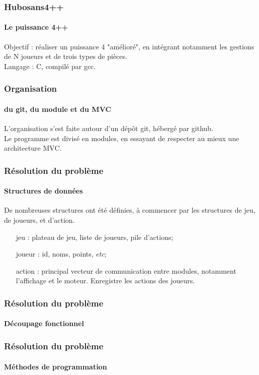 \documentclass{beamer}
\begin{document}
    \begin{frame}
    \frametitle{Hubosans4++}
    \framesubtitle{Le puissance 4++}
        Objectif : réaliser un puissance 4 "amélioré", 
            en intégrant notamment les gestions de N joueurs 
            et de trois types de pièces. \\     
        Langage : C, compilé par gcc.
    \end{frame}


    \begin{frame}
    \frametitle{Organisation}
    \framesubtitle{du git, du module et du MVC}
        L'organisation s'est faite autour d'un dépôt git, 
            hébergé par github. \\ 
        Le programme est divisé en modules, en essayant 
            de respecter au mieux une architecture MVC.
    \end{frame}


    \begin{frame}
    \frametitle{Résolution du problème}
    \framesubtitle{Structures de données}
        De nombreuses structures ont été définies, à commencer 
            par les structures de jeu, de joueurs, et d'action. \\
        \begin{itemize}
        \item[jeu :] plateau de jeu, liste de joueurs, pile d'actions;\\
        \item[joueur :] id, noms, points, \textit{etc};\\
        \item[action :] principal vecteur de communication entre modules, 
            notamment l'affichage et le moteur. Enregistre les actions 
            des joueurs.
        \end{itemize}
    \end{frame}


    \begin{frame}
    \frametitle{Résolution du problème}
    \framesubtitle{Découpage fonctionnel}
    \end{frame}


    \begin{frame}
    \frametitle{Résolution du problème}
    \framesubtitle{Méthodes de programmation}
    \end{frame}
\end{document}
